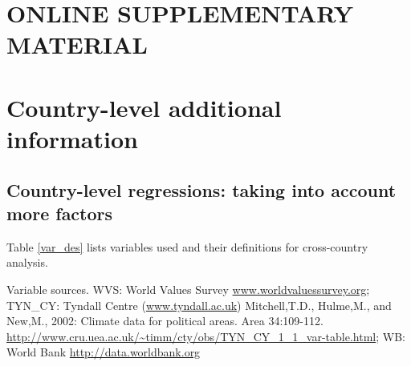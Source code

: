 \documentclass[10pt, letterpaper]{article}
\begin{document}
\begin{spacing}{1.0}










\newpage
\section*{\huge ONLINE SUPPLEMENTARY MATERIAL}

\tableofcontents

\section{Country-level additional information}



\subsection{Country-level regressions: taking into account more factors}


Table \ref{var_des} lists variables used and their definitions for cross-country
analysis. 




{\scriptsize \noindent Variable sources. WVS: World Values Survey \url{www.worldvaluessurvey.org};
TYN\_CY: Tyndall Centre (\url{www.tyndall.ac.uk}) Mitchell,T.D., Hulme,M., and
New,M., 2002: Climate data for political areas. Area
34:109-112. \url{http://www.cru.uea.ac.uk/~timm/cty/obs/TYN_CY_1_1_var-table.html};
WB: World Bank \url{http://data.worldbank.org}}


\end{spacing}
\end{document}
